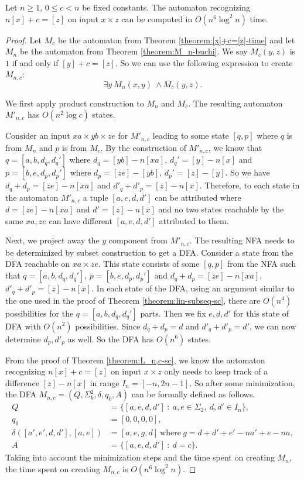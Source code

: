 \documentclass[12pt,reqno]{article}
\def\suchthat{\ : \ }
\begin{document}
\begin{theorem} \label{theorem:n[x]+c=[z]-time}
     Let $n \geq 1$, $0 \leq c < n$ be
     fixed constants. The automaton recognizing $n[x] + c = [z]$ on input $x \times z$ can be computed in $O(n^6 \log^2 n)$ time.
\end{theorem}

\begin{proof}
Let $M_c$ be the automaton from Theorem \ref{theorem:[x]+c=[z]-time} and let $M_n$ be the automaton from Theorem \ref{theorem:M_n-buchi}. We say $M_c(y, z)$ is $1$ if and only if $[y] + c = [z]$. So we can use the following expression to create $M_{n, c}$:
\[
\exists y \  M_n(x, y) \ \land  M_c(y, z).
\]

We first apply product construction to $M_n$ and $M_c$. The resulting automaton $M'_{n,c}$ has $O(n^2\log c)$ states.

Consider an input $xa \times yb \times ze$ for $M'_{n, c}$ leading to some state $[q, p]$ where $q$ is from $M_n$ and $p$ is from $M_c$.
By the construction of $M'_{n, c}$, we know that $q=[a, b, d_q, d_q']$ where $d_q=[yb]-n[xa]$, $d_q'=[y]-n[x]$ and $p=[b, e, d_p, d_p']$ where $d_p = [ze]-[yb]$, $d_p'=[z]-[y]$. So we have $d_q + d_p = [ze]-n[xa]$ and $d'_q + d'_p = [z]-n[x]$.
Therefore, to each state in the automaton $M'_{n, c}$ a tuple $[a, e, d, d']$ can be attributed where $d=[ze]-n[xa]$ and $d'=[z]-n[x]$ and no two states reachable by the same $xa, ze$ can have different $[a, e, d, d']$ attributed to them.

Next, we project away the $y$ component from $M'_{n, c}$.  The resulting NFA needs to be determinized by subset construction to get a DFA.
Consider a state from the DFA reachable on $xa \times ze$. This state consists of some $[q, p]$ from the NFA such that $q=[a, b, d_q, d_q']$, $p=[b, e, d_p, d_p']$ and $d_q + d_p = [ze]-n[xa]$, $d'_q + d'_p = [z]-n[x]$. 
In each state of the DFA, using an argument similar to the one used in the proof of Theorem \ref{theorem:lin-subseq-sc}, there are $O(n^4)$ possibilities for the $q=[a, b, d_q, d_q']$ parts. Then we fix $e, d, d'$ for this state of DFA with $O(n^2)$ possibilities. Since $d_q + d_p =d$ and $d'_q + d'_p = d'$, we can now determine $d_p, d'_p$ as well. So the DFA has $O(n^6)$ states.

From the proof of Theorem \ref{theorem:L_n,c-sc}, we know the automaton recognizing $n[x]+c= [z]$ on input $x \times z$ only needs to keep track of a difference $[z] - n[x]$ in range $I_n = [-n, 2n-1]$. So after some minimization, the DFA $M_{n, c}=(Q, \Sigma^2_k, \delta, q_0, A)$ can be formally defined as follows.
\begin{align*}
Q &= \{ [a, e, d, d']  \suchthat a, e \in \Sigma_2, \ d, d' \in I_n \}, \\
q_0 &= [0, 0, 0, 0], \\
\delta([a', e', d, d'], [a, e]) &= [a, e, g, d] \ \text{where} \ g =d + d' + e'-na' + e-na,
 \\
A &= \{[a, e, d, d'] \suchthat d=c\}.
\end{align*}
Taking into account the minimization steps and the time spent on creating $M_n$, the time spent on creating $M_{n,c }$ is $O(n^6 \log^2 n)$.
\end{proof}
\end{document}
